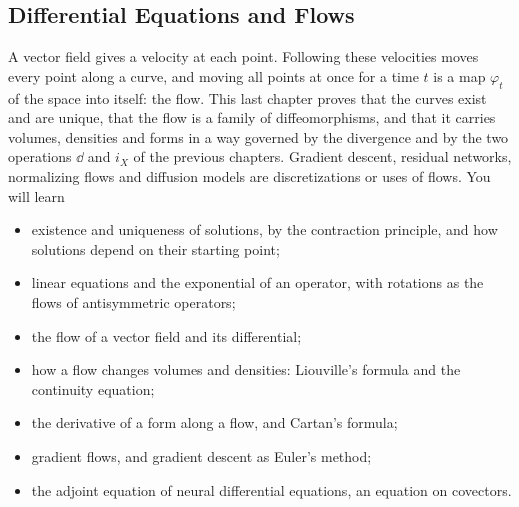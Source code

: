 \begin{notechapter}
\chapter{Differential Equations and Flows}
\label{ch:odes-flows}

\begin{chapterintro}
A vector field gives a velocity at each point. Following these
velocities moves every point along a curve, and moving all points at
once for a time $t$ is a map $\varphi_t$ of the space into itself: the
flow. This last chapter proves that the curves exist and are unique,
that the flow is a family of diffeomorphisms, and that it carries
volumes, densities and forms in a way governed by the divergence and
by the two operations $\dd$ and $i_X$ of the previous chapters.
Gradient descent, residual networks, normalizing flows and diffusion
models are discretizations or uses of flows. You will learn
\begin{itemize}[nosep]
  \item existence and uniqueness of solutions, by the contraction
        principle, and how solutions depend on their starting point;
  \item linear equations and the exponential of an operator, with
        rotations as the flows of antisymmetric operators;
  \item the flow of a vector field and its differential;
  \item how a flow changes volumes and densities: Liouville's formula
        and the continuity equation;
  \item the derivative of a form along a flow, and Cartan's formula;
  \item gradient flows, and gradient descent as Euler's method;
  \item the adjoint equation of neural differential equations, an
        equation on covectors.
\end{itemize}
\end{chapterintro}


\end{notechapter}
